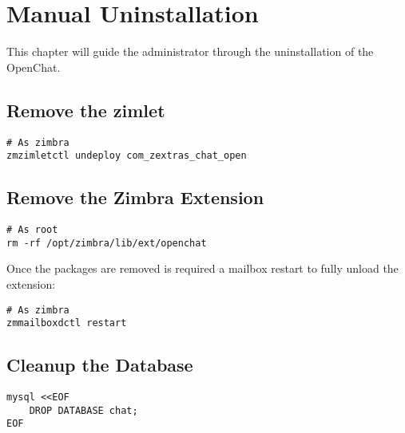 \chapter{Manual Uninstallation}

This chapter will guide the administrator through the uninstallation of the OpenChat.

\section{Remove the zimlet}
\begin{verbatim}
# As zimbra
zmzimletctl undeploy com_zextras_chat_open
\end{verbatim}

\section{Remove the Zimbra Extension}
\begin{verbatim}
# As root
rm -rf /opt/zimbra/lib/ext/openchat
\end{verbatim}
Once the packages are removed is required a mailbox restart to fully unload the extension:
\begin{verbatim}
# As zimbra
zmmailboxdctl restart
\end{verbatim}

\section{Cleanup the Database}
\begin{verbatim}
mysql <<EOF     
	DROP DATABASE chat;
EOF
\end{verbatim}
